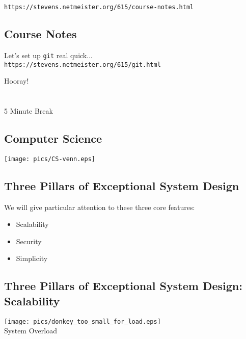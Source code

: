 \documentclass[xga]{xdvislides}
\begin{document}
\verb+https://stevens.netmeister.org/615/course-notes.html+

\subsection{Course Notes}
Let's set up {\tt git} real quick... \\

\vspace{1in}
\verb+https://stevens.netmeister.org/615/git.html+

\newpage
\vspace*{\fill}
\begin{center}
    \Hugesize
        Hooray! \\ [1em]
    \hspace*{5mm}
    \blueline\\
    \hspace*{5mm}\\
        5 Minute Break
\end{center}
\vspace*{\fill}

\subsection{Computer Science}
\vspace*{\fill}
\begin{center}
	\texttt{[image: pics/CS-venn.eps]}
\Normalsize
\end{center}
\vspace*{\fill}

\subsection{Three Pillars of Exceptional System Design}
We will give particular attention to these three core features:
\begin{itemize}
	\item Scalability
	\item Security
	\item Simplicity
\end{itemize}

\subsection{Three Pillars of Exceptional System Design: Scalability}
\vspace*{\fill}
\begin{center}
    \texttt{[image: pics/donkey\_too\_small\_for\_load.eps]} \\
	System Overload
\end{center}
\vspace*{\fill}
\end{document}
